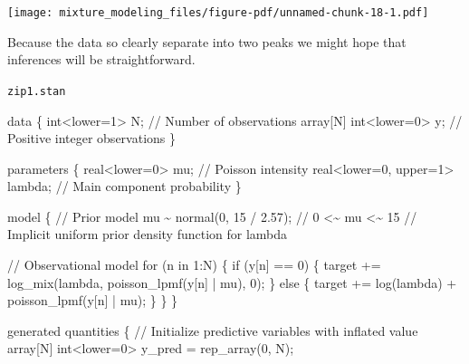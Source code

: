 \documentclass[
  letterpaper,
  DIV=11,
  numbers=noendperiod]{scrartcl}
\newenvironment{Shaded}{\begin{snugshade}}{\end{snugshade}}
\newcommand{\CommentTok}[1]{\textcolor[rgb]{0.37,0.37,0.37}{#1}}
\newcommand{\ControlFlowTok}[1]{\textcolor[rgb]{0.00,0.23,0.31}{#1}}
\newcommand{\DataTypeTok}[1]{\textcolor[rgb]{0.68,0.00,0.00}{#1}}
\newcommand{\DecValTok}[1]{\textcolor[rgb]{0.68,0.00,0.00}{#1}}
\newcommand{\FloatTok}[1]{\textcolor[rgb]{0.68,0.00,0.00}{#1}}
\newcommand{\KeywordTok}[1]{\textcolor[rgb]{0.00,0.23,0.31}{#1}}
\newcommand{\NormalTok}[1]{\textcolor[rgb]{0.00,0.23,0.31}{#1}}
\begin{document}
\texttt{[image: mixture\_modeling\_files/figure-pdf/unnamed-chunk-18-1.pdf]}

Because the data so clearly separate into two peaks we might hope that
inferences will be straightforward.

\begin{codelisting}

\caption{\texttt{zip1.stan}}

\begin{Shaded}
\begin{Highlighting}[]
\KeywordTok{data}\NormalTok{ \{}
  \DataTypeTok{int}\NormalTok{\textless{}}\KeywordTok{lower}\NormalTok{=}\DecValTok{1}\NormalTok{\textgreater{} N;          }\CommentTok{// Number of observations}
  \DataTypeTok{array}\NormalTok{[N] }\DataTypeTok{int}\NormalTok{\textless{}}\KeywordTok{lower}\NormalTok{=}\DecValTok{0}\NormalTok{\textgreater{} y; }\CommentTok{// Positive integer observations}
\NormalTok{\}}

\KeywordTok{parameters}\NormalTok{ \{}
  \DataTypeTok{real}\NormalTok{\textless{}}\KeywordTok{lower}\NormalTok{=}\DecValTok{0}\NormalTok{\textgreater{} mu;              }\CommentTok{// Poisson intensity}
  \DataTypeTok{real}\NormalTok{\textless{}}\KeywordTok{lower}\NormalTok{=}\DecValTok{0}\NormalTok{, }\KeywordTok{upper}\NormalTok{=}\DecValTok{1}\NormalTok{\textgreater{} lambda; }\CommentTok{// Main component probability}
\NormalTok{\}}

\KeywordTok{model}\NormalTok{ \{}
  \CommentTok{// Prior model}
\NormalTok{  mu \textasciitilde{} normal(}\DecValTok{0}\NormalTok{, }\DecValTok{15}\NormalTok{ / }\FloatTok{2.57}\NormalTok{); }\CommentTok{// 0 \textless{}\textasciitilde{} mu \textless{}\textasciitilde{} 15}
  \CommentTok{// Implicit uniform prior density function for lambda}

  \CommentTok{// Observational model}
  \ControlFlowTok{for}\NormalTok{ (n }\ControlFlowTok{in} \DecValTok{1}\NormalTok{:N) \{}
    \ControlFlowTok{if}\NormalTok{ (y[n] == }\DecValTok{0}\NormalTok{) \{}
      \KeywordTok{target +=}\NormalTok{ log\_mix(lambda, poisson\_lpmf(y[n] | mu), }\DecValTok{0}\NormalTok{);}
\NormalTok{    \} }\ControlFlowTok{else}\NormalTok{ \{}
      \KeywordTok{target +=}\NormalTok{ log(lambda) + poisson\_lpmf(y[n] | mu);}
\NormalTok{    \}}
\NormalTok{  \}}
\NormalTok{\}}

\KeywordTok{generated quantities}\NormalTok{ \{}
  \CommentTok{// Initialize predictive variables with inflated value}
  \DataTypeTok{array}\NormalTok{[N] }\DataTypeTok{int}\NormalTok{\textless{}}\KeywordTok{lower}\NormalTok{=}\DecValTok{0}\NormalTok{\textgreater{} y\_pred = rep\_array(}\DecValTok{0}\NormalTok{, N);}


\end{Highlighting}
\end{Shaded}
\end{codelisting}
\end{document}
